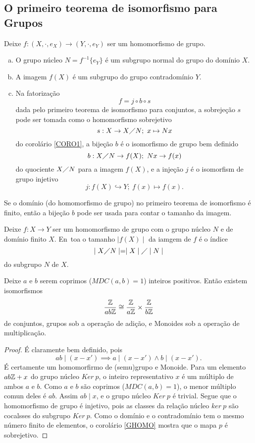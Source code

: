 \subsection{O primeiro teorema de isomorfismo para Grupos}
\begin{theorem}
  Deixe $f: (X, \cdot, e_{X}) \to (Y, \cdot, e_{Y})$ ser um homomorfismo de grupo.
\begin{enumerate}[(a)]
  \item O grupo núcleo $N = f^{-1}\{e_{Y}\}$ é um subgrupo normal do grupo do domínio $X$.
  \item A imagem $f(X)$ é um subgrupo do grupo contradomínio $Y$.
  \item Na fatorização $$f = j \circ b \circ s$$ dada pelo primeiro teorema de isomorfismo para conjuntos, a sobrejeção $s$ pode ser tomada como o homomorfismo sobrejetivo $$s: X\to X\diagup N;\ x\mapsto Nx$$ do corolário \ref{CORO1}, a bijeção $b$ é o isomorfismo de grupo bem definido $$b: X\diagup N \to f(X);\ Nx \to f(x)$$ do quociente $X\diagup N$ para a imagem $f(X)$, e a injeção $j$ é o isomorfism de grupo injetivo $$j: f(X) \hookrightarrow Y;\ f(x) \mapsto f(x).$$
\end{enumerate}
  Se o domínio (do homomorfismo de grupo) no primeiro teorema de isomorfismo é finito, então a bijeção $b$ pode ser usada para contar o tamanho da imagem.
\end{theorem}
\begin{corollary}\label{GHOMO}
  Deixe $f: X\to Y$ ser um homomorfismo de grupo com o grupo núcleo $N$ e de domínio finito $X$. En~toa o tamanho $\mid f(X) \mid$ da iamgem de $f$ é o índice $$\mid X\diagup N\mid = \mid X \mid \diagup \mid N \mid$$ do subgrupo $N$ de $X$.
\end{corollary}
\begin{theorem}
  Deixe $a$ e $b$ serem coprimos ($MDC(a,b) = 1$) inteiros positivos. Então existem isomorfismos $$\dfrac{\mathbb{Z}}{ab\mathbb{Z}} \cong \dfrac{\mathbb{Z}}{a\mathbb{Z}} \times \dfrac{\mathbb{Z}}{b\mathbb{Z}}$$ de conjuntos, grupos sob a operação de adição, e Monoides sob a operação de multiplicação.
  \begin{proof}
    É claramente bem definido, pois $$ab \mid (x - x') \implies a \mid (x - x') \wedge b \mid (x - x').$$ É certamente um homomorfirmo de (semu)grupo e Monoide. Para um elemento $ab\mathbb{Z} + x$ do grupo núcleo $Ker\ p$, o inteiro representativo $x$ é um múltiplo de ambos $a$ e $b$. Como $a$ e $b$ são coprimos ($MDC(a,b) = 1$), o menor múltiplo comun deles é $ab$. Assim $ab \mid x$, e o grupo núcleo $Ker\ p$ é trivial. Segue que o homomorfismo de grupo é injetivo, pois as classes da relação núcleo $ker\ p$ são cocalsses do subgrupo $Ker\ p$. Como o domínio e o contradomínio tem o mesmo número finito de elementos, o corolário \ref{GHOMO} mostra que o mapa $p$ é sobrejetivo.
  \end{proof}
\end{theorem}

